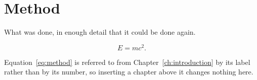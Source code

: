 \chapter{Method}
\label{ch:method}

What was done, in enough detail that it could be done again.

\begin{equation}
  \label{eq:method}
  E = mc^{2}.
\end{equation}

Equation~\eqref{eq:method} is referred to from Chapter~\ref{ch:introduction}
by its label rather than by its number, so inserting a chapter above it
changes nothing here.

